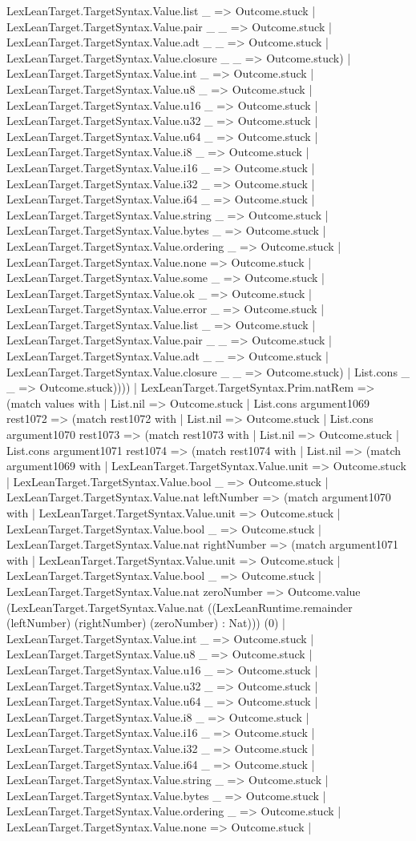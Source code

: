 \documentclass[11pt]{article}
\begin{document}
LexLeanTarget.TargetSyntax.Value.list \_ => Outcome.stuck | LexLeanTarget.TargetSyntax.Value.pair \_ \_ => Outcome.stuck | LexLeanTarget.TargetSyntax.Value.adt \_ \_ => Outcome.stuck | LexLeanTarget.TargetSyntax.Value.closure \_ \_ => Outcome.stuck) | LexLeanTarget.TargetSyntax.Value.int \_ => Outcome.stuck | LexLeanTarget.TargetSyntax.Value.u8 \_ => Outcome.stuck | LexLeanTarget.TargetSyntax.Value.u16 \_ => Outcome.stuck | LexLeanTarget.TargetSyntax.Value.u32 \_ => Outcome.stuck | LexLeanTarget.TargetSyntax.Value.u64 \_ => Outcome.stuck | LexLeanTarget.TargetSyntax.Value.i8 \_ => Outcome.stuck | LexLeanTarget.TargetSyntax.Value.i16 \_ => Outcome.stuck | LexLeanTarget.TargetSyntax.Value.i32 \_ => Outcome.stuck | LexLeanTarget.TargetSyntax.Value.i64 \_ => Outcome.stuck | LexLeanTarget.TargetSyntax.Value.string \_ => Outcome.stuck | LexLeanTarget.TargetSyntax.Value.bytes \_ => Outcome.stuck | LexLeanTarget.TargetSyntax.Value.ordering \_ => Outcome.stuck | LexLeanTarget.TargetSyntax.Value.none => Outcome.stuck | LexLeanTarget.TargetSyntax.Value.some \_ => Outcome.stuck | LexLeanTarget.TargetSyntax.Value.ok \_ => Outcome.stuck | LexLeanTarget.TargetSyntax.Value.error \_ => Outcome.stuck | LexLeanTarget.TargetSyntax.Value.list \_ => Outcome.stuck | LexLeanTarget.TargetSyntax.Value.pair \_ \_ => Outcome.stuck | LexLeanTarget.TargetSyntax.Value.adt \_ \_ => Outcome.stuck | LexLeanTarget.TargetSyntax.Value.closure \_ \_ => Outcome.stuck) | List.cons \_ \_ => Outcome.stuck)))) | LexLeanTarget.TargetSyntax.Prim.natRem => (match values with | List.nil => Outcome.stuck | List.cons argument1069 rest1072 => (match rest1072 with | List.nil => Outcome.stuck | List.cons argument1070 rest1073 => (match rest1073 with | List.nil => Outcome.stuck | List.cons argument1071 rest1074 => (match rest1074 with | List.nil => (match argument1069 with | LexLeanTarget.TargetSyntax.Value.unit => Outcome.stuck | LexLeanTarget.TargetSyntax.Value.bool \_ => Outcome.stuck | LexLeanTarget.TargetSyntax.Value.nat leftNumber => (match argument1070 with | LexLeanTarget.TargetSyntax.Value.unit => Outcome.stuck | LexLeanTarget.TargetSyntax.Value.bool \_ => Outcome.stuck | LexLeanTarget.TargetSyntax.Value.nat rightNumber => (match argument1071 with | LexLeanTarget.TargetSyntax.Value.unit => Outcome.stuck | LexLeanTarget.TargetSyntax.Value.bool \_ => Outcome.stuck | LexLeanTarget.TargetSyntax.Value.nat zeroNumber => Outcome.value (LexLeanTarget.TargetSyntax.Value.nat ((LexLeanRuntime.remainder (leftNumber) (rightNumber) (zeroNumber) : Nat))) (0) | LexLeanTarget.TargetSyntax.Value.int \_ => Outcome.stuck | LexLeanTarget.TargetSyntax.Value.u8 \_ => Outcome.stuck | LexLeanTarget.TargetSyntax.Value.u16 \_ => Outcome.stuck | LexLeanTarget.TargetSyntax.Value.u32 \_ => Outcome.stuck | LexLeanTarget.TargetSyntax.Value.u64 \_ => Outcome.stuck | LexLeanTarget.TargetSyntax.Value.i8 \_ => Outcome.stuck | LexLeanTarget.TargetSyntax.Value.i16 \_ => Outcome.stuck | LexLeanTarget.TargetSyntax.Value.i32 \_ => Outcome.stuck | LexLeanTarget.TargetSyntax.Value.i64 \_ => Outcome.stuck | LexLeanTarget.TargetSyntax.Value.string \_ => Outcome.stuck | LexLeanTarget.TargetSyntax.Value.bytes \_ => Outcome.stuck | LexLeanTarget.TargetSyntax.Value.ordering \_ => Outcome.stuck | LexLeanTarget.TargetSyntax.Value.none => Outcome.stuck | 
\end{document}
